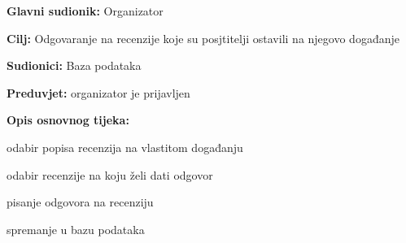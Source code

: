 					\noindent {}
					\begin{packed_item}
	
						\item \textbf{Glavni sudionik: }Organizator
						\item  \textbf{Cilj:} Odgovaranje na recenzije koje su posjtitelji ostavili na njegovo događanje
						\item  \textbf{Sudionici:} Baza podataka
						\item  \textbf{Preduvjet:} organizator je prijavljen
						\item  \textbf{Opis osnovnog tijeka:}
						
						\item[] \begin{packed_enum}
	
							\item odabir popisa recenzija na vlastitom događanju 
							\item odabir recenzije na koju želi dati odgovor
							\item pisanje odgovora na recenziju 
							\item spremanje u bazu podataka
							
						\end{packed_enum}

					\end{packed_item}
					
